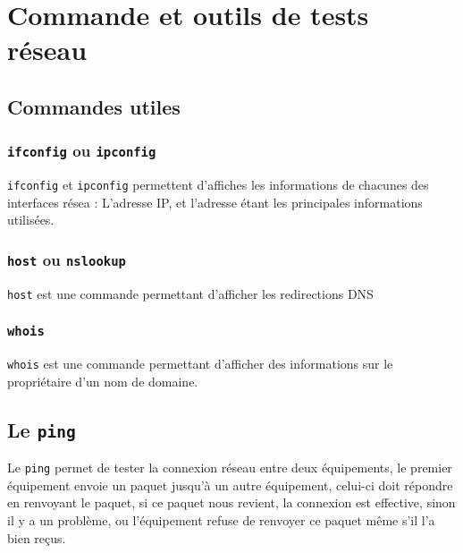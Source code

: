 \documentclass[a4paper, 11pt]{article}
\newcommand{\mac}{\bsc{mac}}
\begin{document}
	\maketitle
	\section{Commande et outils de tests réseau}
	\subsection{Commandes utiles}
	\subsubsection{\texttt{ifconfig} ou \texttt{ipconfig}}
	\texttt{ifconfig} et \texttt{ipconfig} permettent d'affiches les informations de chacunes des interfaces résea : L'adresse IP, et l'adresse \mac étant les
	principales informations utilisées.
	\subsubsection{\texttt{host} ou \texttt{nslookup}}
	\texttt{host} est une commande permettant d'afficher les redirections DNS
	\subsubsection{\texttt{whois}}
	\texttt{whois} est une commande permettant d'afficher des informations sur le propriétaire d'un nom de domaine.
	\subsection{Le \texttt{ping}}
	Le \texttt{ping} permet de tester la connexion réseau entre deux équipements, le premier équipement envoie un paquet jusqu'à un autre équipement, celui-ci
	doit répondre en renvoyant le paquet, si ce paquet nous revient, la connexion est effective, sinon il y a un problème, ou l'équipement refuse de renvoyer ce
	paquet même s'il l'a bien reçus.
\end{document}
